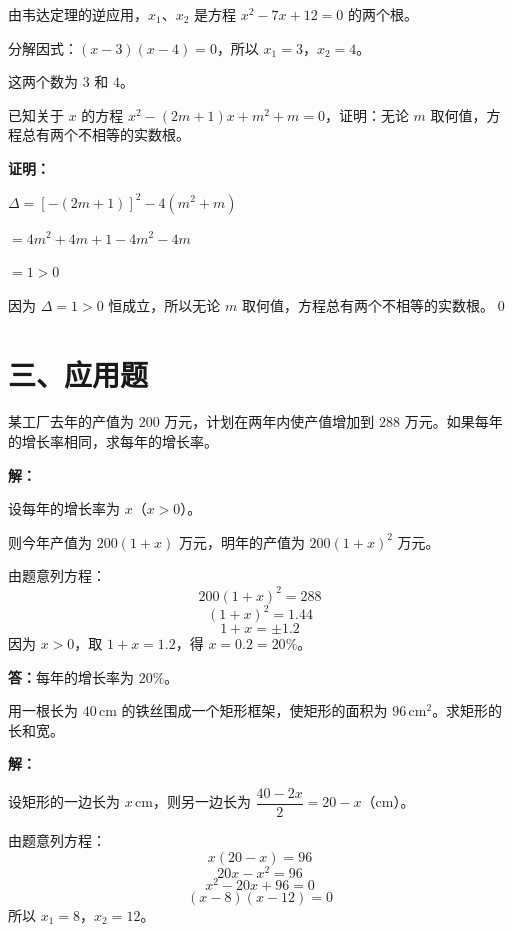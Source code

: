 \documentclass[12pt, a4paper]{ctexart}
\begin{document}
由韦达定理的逆应用，$x_1$、$x_2$ 是方程 $x^2 - 7x + 12 = 0$ 的两个根。

分解因式：$(x-3)(x-4)=0$，所以 $x_1=3$，$x_2=4$。

这两个数为 $\boxed{3}$ 和 $\boxed{4}$。

\begin{examplebox}[【例8】含参数的方程讨论]
已知关于 $x$ 的方程 $x^2 - (2m+1)x + m^2 + m = 0$，证明：无论 $m$ 取何值，方程总有两个不相等的实数根。
\end{examplebox}

\textbf{证明：}

$\Delta = [-(2m+1)]^2 - 4(m^2+m)$

$= 4m^2 + 4m + 1 - 4m^2 - 4m$

$= 1 > 0$

因为 $\Delta = 1 > 0$ 恒成立，所以无论 $m$ 取何值，方程总有两个不相等的实数根。\qed

\section*{\textcolor{apppurple}{三、应用题}}

\begin{appbox}[【应用1】增长率问题]
某工厂去年的产值为 $200$ 万元，计划在两年内使产值增加到 $288$ 万元。如果每年的增长率相同，求每年的增长率。
\end{appbox}

\textbf{解：}

设每年的增长率为 $x$（$x>0$）。

则今年产值为 $200(1+x)$ 万元，明年的产值为 $200(1+x)^2$ 万元。

由题意列方程：
\[
200(1+x)^2 = 288
\]
\[
(1+x)^2 = 1.44
\]
\[
1+x = \pm 1.2
\]
因为 $x>0$，取 $1+x=1.2$，得 $x=0.2=20\%$。

\textbf{答：}每年的增长率为 $\boxed{20\%}$。

\begin{appbox}[【应用2】面积问题]
用一根长为 $40$\,cm 的铁丝围成一个矩形框架，使矩形的面积为 $96$\,cm$^2$。求矩形的长和宽。
\end{appbox}

\textbf{解：}

设矩形的一边长为 $x$\,cm，则另一边长为 $\dfrac{40-2x}{2} = 20-x$（cm）。

由题意列方程：
\[
x(20-x) = 96
\]
\[
20x - x^2 = 96
\]
\[
x^2 - 20x + 96 = 0
\]
\[
(x-8)(x-12) = 0
\]
所以 $x_1 = 8$，$x_2 = 12$。
\end{document}
